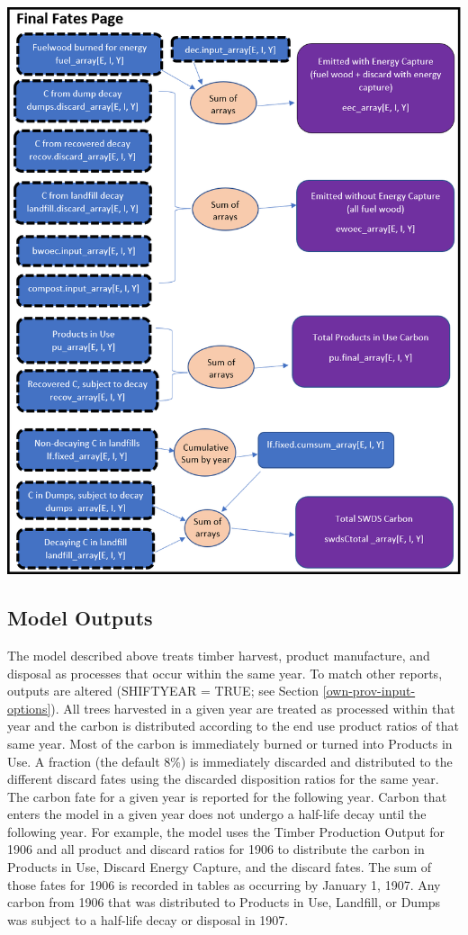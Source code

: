 \documentclass[
  openany]{book}
\begin{document}
\newpage

\includegraphics[width=1\linewidth]{images/schematic-7}

\hypertarget{model-func-out}{%
\subsection{Model Outputs}\label{model-func-out}}

The model described above treats timber harvest, product manufacture, and disposal as processes that occur within the same year. To match other reports, outputs are altered (SHIFTYEAR = TRUE; see Section \ref{own-prov-input-options}). All trees harvested in a given year are treated as processed within that year and the carbon is distributed according to the end use product ratios of that same year. Most of the carbon is immediately burned or turned into Products in Use. A fraction (the default 8\%) is immediately discarded and distributed to the different discard fates using the discarded disposition ratios for the same year. The carbon fate for a given year is reported for the following year. Carbon that enters the model in a given year does not undergo a half-life decay until the following year. For example, the model uses the Timber Production Output for 1906 and all product and discard ratios for 1906 to distribute the carbon in Products in Use, Discard Energy Capture, and the discard fates. The sum of those fates for 1906 is recorded in tables as occurring by January 1, 1907. Any carbon from 1906 that was distributed to Products in Use, Landfill, or Dumps was subject to a half-life decay or disposal in 1907.
\end{document}
